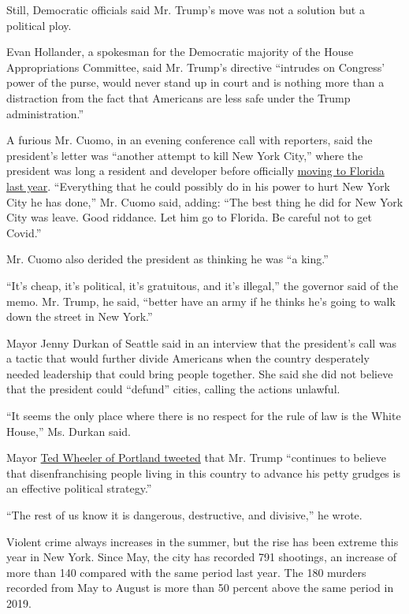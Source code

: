 Still, Democratic officials said Mr. Trump's move was not a solution but
a political ploy.

Evan Hollander, a spokesman for the Democratic majority of the House
Appropriations Committee, said Mr. Trump's directive ``intrudes on
Congress' power of the purse, would never stand up in court and is
nothing more than a distraction from the fact that Americans are less
safe under the Trump administration.''

A furious Mr. Cuomo, in an evening conference call with reporters, said
the president's letter was ``another attempt to kill New York City,''
where the president was long a resident and developer before officially
\href{https://www.nytimes3xbfgragh.onion/2019/10/31/us/politics/trump-new-york-florida-primary-residence.html}{moving
to Florida last year}. ``Everything that he could possibly do in his
power to hurt New York City he has done,'' Mr. Cuomo said, adding: ``The
best thing he did for New York City was leave. Good riddance. Let him go
to Florida. Be careful not to get Covid.''

Mr. Cuomo also derided the president as thinking he was ``a king.''

``It's cheap, it's political, it's gratuitous, and it's illegal,'' the
governor said of the memo. Mr. Trump, he said, ``better have an army if
he thinks he's going to walk down the street in New York.''

Mayor Jenny Durkan of Seattle said in an interview that the president's
call was a tactic that would further divide Americans when the country
desperately needed leadership that could bring people together. She said
she did not believe that the president could ``defund'' cities, calling
the actions unlawful.

``It seems the only place where there is no respect for the rule of law
is the White House,'' Ms. Durkan said.

Mayor
\href{https://twitter.com/tedwheeler/status/1301341561813266432?s=20}{Ted
Wheeler of Portland tweeted} that Mr. Trump ``continues to believe that
disenfranchising people living in this country to advance his petty
grudges is an effective political strategy.''

``The rest of us know it is dangerous, destructive, and divisive,'' he
wrote.

Violent crime always increases in the summer, but the rise has been
extreme this year in New York. Since May, the city has recorded 791
shootings, an increase of more than 140 compared with the same period
last year. The 180 murders recorded from May to August is more than 50
percent above the same period in 2019.


